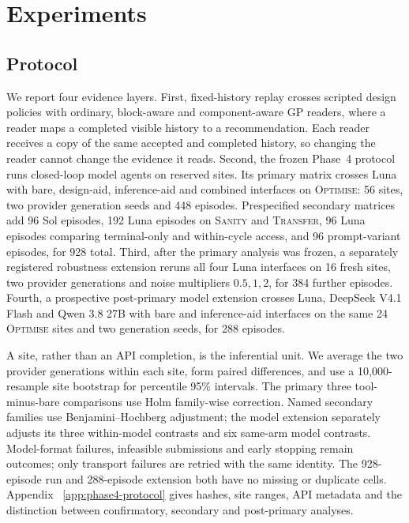\FloatBarrier
\section{Experiments}
\label{sec:llm}
\label{sec:results}

\subsection{Protocol}
\label{sec:setup}

We report four evidence layers. First, fixed-history replay crosses scripted design
policies with ordinary, block-aware and component-aware GP readers, where a reader maps a
completed visible history to a recommendation. Each reader receives a copy of the same
accepted and completed history, so changing the reader cannot change the evidence it reads.
Second, the frozen Phase~4 protocol runs closed-loop model agents on reserved sites. Its
primary matrix crosses Luna with bare, design-aid, inference-aid and combined interfaces on
\textsc{Optimise}: 56 sites, two provider generation seeds and 448 episodes. Prespecified
secondary matrices add 96 Sol episodes, 192 Luna episodes on \textsc{Sanity} and
\textsc{Transfer}, 96 Luna episodes comparing terminal-only and within-cycle access, and 96
prompt-variant episodes, for 928 total. Third, after the primary analysis was frozen, a
separately registered robustness extension reruns all four Luna interfaces on 16 fresh
sites, two provider generations and noise multipliers $0.5,1,2$, for 384 further episodes.
Fourth, a prospective post-primary model extension crosses Luna, DeepSeek V4.1 Flash and
Qwen 3.8 27B with bare and inference-aid interfaces on the same 24 \textsc{Optimise} sites
and two generation seeds, for 288 episodes.

A site, rather than an API completion, is the inferential unit. We average the two provider
generations within each site, form paired differences, and use a 10,000-resample site
bootstrap for percentile 95\% intervals. The primary three tool-minus-bare comparisons use
Holm family-wise correction. Named secondary families use Benjamini--Hochberg adjustment;
the model extension separately adjusts its three within-model contrasts and six same-arm
model contrasts. Model-format failures, infeasible submissions and early stopping remain
outcomes; only transport failures are retried with the same identity. The 928-episode run
and 288-episode extension both have no missing or duplicate cells. Appendix~
\ref{app:phase4-protocol} gives hashes, site ranges, API metadata and the distinction
between confirmatory, secondary and post-primary analyses.

